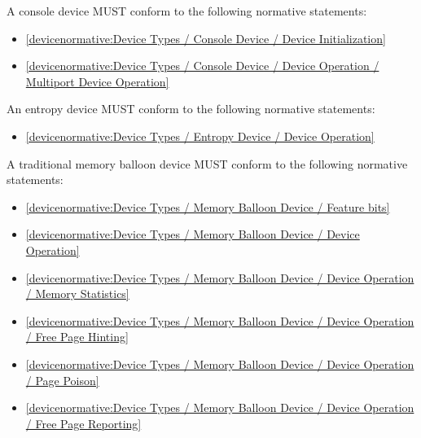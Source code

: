 A console device MUST conform to the following normative statements:

\begin{itemize}
\item \ref{devicenormative:Device Types / Console Device / Device Initialization}
\item \ref{devicenormative:Device Types / Console Device / Device Operation / Multiport Device Operation}
\end{itemize}

\label{sec:Conformance / Device Conformance / Entropy Device Conformance}

An entropy device MUST conform to the following normative statements:

\begin{itemize}
\item \ref{devicenormative:Device Types / Entropy Device / Device Operation}
\end{itemize}

\label{sec:Conformance / Device Conformance / Traditional Memory Balloon Device Conformance}

A traditional memory balloon device MUST conform to the following normative statements:

\begin{itemize}
\item \ref{devicenormative:Device Types / Memory Balloon Device / Feature bits}
\item \ref{devicenormative:Device Types / Memory Balloon Device / Device Operation}
\item \ref{devicenormative:Device Types / Memory Balloon Device / Device Operation / Memory Statistics}
\item \ref{devicenormative:Device Types / Memory Balloon Device / Device Operation / Free Page Hinting}
\item \ref{devicenormative:Device Types / Memory Balloon Device / Device Operation / Page Poison}
\item \ref{devicenormative:Device Types / Memory Balloon Device / Device Operation / Free Page Reporting}
\end{itemize}

